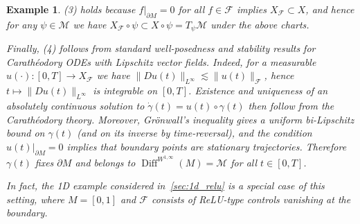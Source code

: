 \documentclass[12pt]{amsart}
\numberwithin{equation}{section}
\newtheorem{example}{Example}[section]
\theoremstyle{remark}
\begin{document}
\begin{example}
\textup{(3)} holds because $f|_{\partial M}=0$ for all $f\in\mathcal F$ implies $X_{\mathcal F}\subset X$,
and hence for any $\psi\in\mathcal M$ we have $X_{\mathcal F}\circ\psi\subset X\circ\psi=T_\psi\mathcal M$ under the above charts.

Finally, \textup{(4)} follows from standard well-posedness and stability results for Carath\'eodory ODEs with Lipschitz vector fields.
Indeed, for a measurable $u(\cdot):[0,T]\to X_{\mathcal F}$ we have $\|Du(t)\|_{L^\infty}\lesssim \|u(t)\|_{\mathcal F}$, hence
$t\mapsto \|Du(t)\|_{L^\infty}$ is integrable on $[0,T]$.
Existence and uniqueness of an absolutely continuous solution to $\dot\gamma(t)=u(t)\circ\gamma(t)$ then follow from the Carath\'eodory theory.
Moreover, Gr\"onwall's inequality gives a uniform bi-Lipschitz bound on $\gamma(t)$ (and on its inverse by time-reversal),
and the condition $u(t)|_{\partial M}=0$ implies that boundary points are stationary trajectories.
Therefore $\gamma(t)$ fixes $\partial M$ and belongs to $\operatorname{Diff}^{W^{1,\infty}}(M)=\mathcal M$ for all $t\in[0,T]$.

In fact, the 1D example considered in~\cref{sec:1d_relu} is a special case of this setting, where $M=[0,1]$ and $\mathcal F$ consists of ReLU-type controls vanishing at the boundary.
\end{example}



\end{document}
